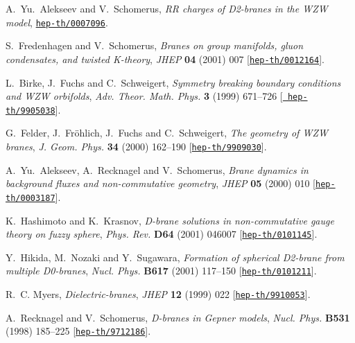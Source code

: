 \documentclass[12pt,a4paper]{article}
\begin{document}
\begin{thebibliography}{10}
A.~Yu.~Alekseev and V.~Schomerus, {\it {RR} charges of {D2-branes} in the {WZW}
  model},  \href{http://arXiv.org/abs/hep-th/0007096}{{\tt hep-th/0007096}}.

S.~Fredenhagen and V.~Schomerus, {\it Branes on group manifolds, gluon
  condensates, and twisted {K-theory}},  {\em JHEP} {\bf 04} (2001) 007
  [\href{http://arXiv.org/abs/hep-th/0012164}{{\tt hep-th/0012164}}].

L.~Birke, J.~Fuchs and C.~Schweigert, {\it Symmetry breaking boundary
  conditions and {WZW} orbifolds},  {\em Adv. Theor. Math. Phys.} {\bf 3}
  (1999) 671--726 [\href{http://arXiv.org/abs/hep-th/9905038}{{\tt
  hep-th/9905038}}].

G.~Felder, J.~{Fr\"ohlich}, J.~Fuchs and C.~Schweigert, {\it The geometry of
  {WZW} branes},  {\em J. Geom. Phys.} {\bf 34} (2000) 162--190
  [\href{http://arXiv.org/abs/hep-th/9909030}{{\tt hep-th/9909030}}].

A.~Yu.~Alekseev, A.~Recknagel and V.~Schomerus, {\it Brane dynamics in
  background fluxes and non-commutative geometry},  {\em JHEP} {\bf 05} (2000)
  010 [\href{http://arXiv.org/abs/hep-th/0003187}{{\tt hep-th/0003187}}].

K.~Hashimoto and K.~Krasnov, {\it D-brane solutions in non-commutative gauge
  theory on fuzzy sphere},  {\em Phys. Rev.} {\bf D64} (2001) 046007
  [\href{http://arXiv.org/abs/hep-th/0101145}{{\tt hep-th/0101145}}].

Y.~Hikida, M.~Nozaki and Y.~Sugawara, {\it Formation of spherical {D2-brane}
  from multiple {D0-branes}},  {\em Nucl. Phys.} {\bf B617} (2001) 117--150
  [\href{http://arXiv.org/abs/hep-th/0101211}{{\tt hep-th/0101211}}].

R.~C. Myers, {\it Dielectric-branes},  {\em JHEP} {\bf 12} (1999) 022
  [\href{http://arXiv.org/abs/hep-th/9910053}{{\tt hep-th/9910053}}].

A.~Recknagel and V.~Schomerus, {\it D-branes in {Gepner} models},  {\em Nucl.
  Phys.} {\bf B531} (1998) 185--225
  [\href{http://arXiv.org/abs/hep-th/9712186}{{\tt hep-th/9712186}}].


\end{thebibliography}
\end{document}
